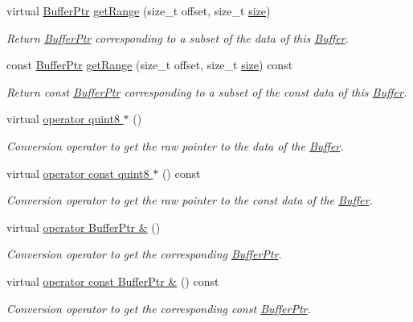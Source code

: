 \begin{DoxyCompactItemize}
virtual \hyperlink{class_gost_crypt_1_1_buffer_ptr}{Buffer\+Ptr} \hyperlink{class_gost_crypt_1_1_buffer_acb9b5e46856fd25584e459d5f998adf2}{get\+Range} (size\+\_\+t offset, size\+\_\+t \hyperlink{class_gost_crypt_1_1_buffer_a5324726029e7f906f2f14e54eeb1ab82}{size})
\begin{DoxyCompactList}\small\item\em Return \hyperlink{class_gost_crypt_1_1_buffer_ptr}{Buffer\+Ptr} corresponding to a subset of the data of this \hyperlink{class_gost_crypt_1_1_buffer}{Buffer}. \end{DoxyCompactList}\item 
const \hyperlink{class_gost_crypt_1_1_buffer_ptr}{Buffer\+Ptr} \hyperlink{class_gost_crypt_1_1_buffer_afd2d566e10c24d5fa8f8fc28ea31a189}{get\+Range} (size\+\_\+t offset, size\+\_\+t \hyperlink{class_gost_crypt_1_1_buffer_a5324726029e7f906f2f14e54eeb1ab82}{size}) const
\begin{DoxyCompactList}\small\item\em Return const \hyperlink{class_gost_crypt_1_1_buffer_ptr}{Buffer\+Ptr} corresponding to a subset of the const data of this \hyperlink{class_gost_crypt_1_1_buffer}{Buffer}. \end{DoxyCompactList}\item 
virtual \hyperlink{class_gost_crypt_1_1_buffer_a3f1a73b8d61efa1469adea03408f837d}{operator quint8 $\ast$} ()
\begin{DoxyCompactList}\small\item\em Conversion operator to get the raw pointer to the data of the \hyperlink{class_gost_crypt_1_1_buffer}{Buffer}. \end{DoxyCompactList}\item 
virtual \hyperlink{class_gost_crypt_1_1_buffer_a025beb50a8f31598c8139af58911af34}{operator const quint8 $\ast$} () const
\begin{DoxyCompactList}\small\item\em Conversion operator to get the raw pointer to the const data of the \hyperlink{class_gost_crypt_1_1_buffer}{Buffer}. \end{DoxyCompactList}\item 
virtual \hyperlink{class_gost_crypt_1_1_buffer_a440928271a80ac5014ba240e6595ff85}{operator Buffer\+Ptr \&} ()
\begin{DoxyCompactList}\small\item\em Conversion operator to get the corresponding \hyperlink{class_gost_crypt_1_1_buffer_ptr}{Buffer\+Ptr}. \end{DoxyCompactList}\item 
virtual \hyperlink{class_gost_crypt_1_1_buffer_a493a94d9ba6761d823e6e2f61c052226}{operator const Buffer\+Ptr \&} () const
\begin{DoxyCompactList}\small\item\em Conversion operator to get the corresponding const \hyperlink{class_gost_crypt_1_1_buffer_ptr}{Buffer\+Ptr}. \end{DoxyCompactList}\end{DoxyCompactItemize}
